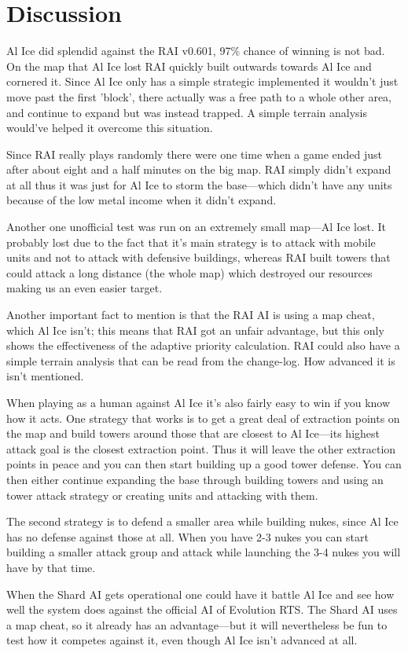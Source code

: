 \chapter{Discussion}
Al Ice did splendid against the RAI v0.601, 97\% chance of winning is not bad.
On the map that Al Ice lost RAI quickly built outwards towards Al Ice and
cornered it. Since Al Ice only has a simple strategic implemented it wouldn't
just move past the first 'block', there actually was a free path to a whole
other area, and continue to expand but was instead trapped. A simple terrain
analysis would've helped it overcome this situation.

Since RAI really plays randomly there were one time when a game ended just after
about eight and a half minutes on the big map. RAI simply didn't expand at all
thus it was just for Al Ice to storm the base---which didn't have any units
because of the low metal income when it didn't expand.

Another one unofficial test was run on an extremely small map---Al Ice lost. It
probably lost due to the fact that it's main strategy is to attack with mobile
units and not to attack with defensive buildings, whereas RAI built towers that
could attack a long distance (the whole map) which destroyed our resources making
us an even easier target.

Another important fact to mention is that the RAI AI is using a map cheat, which
Al Ice isn't; this means that RAI got an unfair advantage, but this only shows the
effectiveness of the adaptive priority calculation. RAI could also have a simple
terrain analysis that can be read from the change-log\cite{RAI10}. How advanced
it is isn't mentioned.

When playing as a human against Al Ice
it's also fairly easy to win if you know how it acts. One strategy that works is to get a great deal
of extraction points on the map and build towers around those that are closest to Al Ice---its
highest attack goal is the closest extraction point. Thus it will leave the other extraction points
in peace and you can then start building up a good tower defense. You can then either continue
expanding the base through building towers and using an tower attack strategy or creating units and
attacking with them.

The second strategy is to defend a smaller area while building nukes, since Al Ice has no defense
against those at all. When you have 2-3 nukes you can start building a smaller attack group and
attack while launching the 3-4 nukes you will have by that time.

When the Shard AI gets operational one could have it battle Al Ice
and see how well the system does against the official AI of Evolution RTS. The
Shard AI uses a map cheat, so it already has an advantage---but it will nevertheless be fun to test
how it competes against it, even though Al Ice isn't advanced at all.